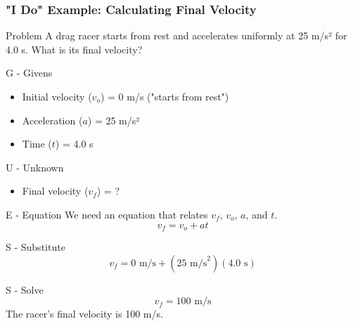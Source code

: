 \documentclass{beamer}
\begin{document}
\begin{frame}[allowframebreaks]
\frametitle{"I Do" Example: Calculating Final Velocity}
\begin{block}{Problem}
A drag racer starts from rest and accelerates uniformly at 25 m/s² for 4.0 s. What is its final velocity?
\end{block}

\begin{alertblock}{G - Givens}
\begin{itemize}
    \item Initial velocity ($v_o$) = 0 m/s ("starts from rest")
    \item Acceleration ($a$) = 25 m/s²
    \item Time ($t$) = 4.0 s
\end{itemize}
\end{alertblock}

\begin{alertblock}{U - Unknown}
\begin{itemize}
    \item Final velocity ($v_f$) = ?
\end{itemize}
\end{alertblock}

\begin{alertblock}{E - Equation}
We need an equation that relates $v_f$, $v_o$, $a$, and $t$.
\begin{equation*}
v_f = v_o + at
\end{equation*}
\end{alertblock}

\begin{alertblock}{S - Substitute}
\begin{equation*}
v_f = 0 \text{ m/s} + (25 \text{ m/s}^2)(4.0 \text{ s})
\end{equation*}
\end{alertblock}

\begin{alertblock}{S - Solve}
\begin{equation*}
v_f = 100 \text{ m/s}
\end{equation*}
The racer's final velocity is 100 m/s.
\end{alertblock}
\end{frame}
\end{document}
